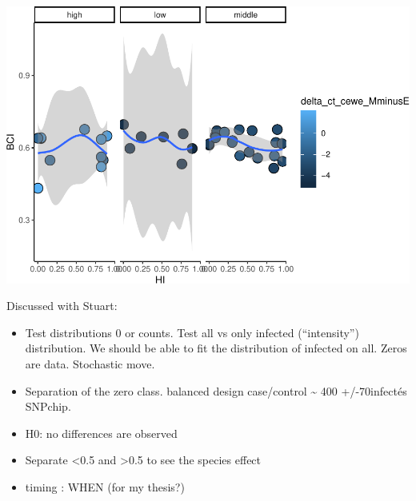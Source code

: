 \documentclass[]{article}
\providecommand{\tightlist}{%
  \setlength{\itemsep}{0pt}\setlength{\parskip}{0pt}}
\begin{document}
\includegraphics{Data_Analysis_Alice_files/figure-latex/unnamed-chunk-1-7.pdf}

Discussed with Stuart:

\begin{itemize}
\tightlist
\item
  Test distributions 0 or counts. Test all vs only infected
  (``intensity'') distribution. We should be able to fit the
  distribution of infected on all. Zeros are data. Stochastic move.
\item
  Separation of the zero class. balanced design case/control
  \textasciitilde{} 400 +/-70infectés SNPchip.
\item
  H0: no differences are observed
\item
  Separate \textless{}0.5 and \textgreater{}0.5 to see the species
  effect
\item
  timing : WHEN (for my thesis?)
\end{itemize}
\end{document}
